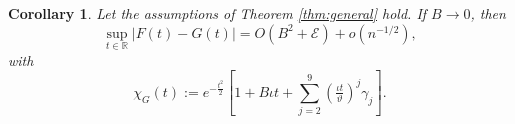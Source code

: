 \documentclass[11pt]{article}
\newtheorem{coro}{Corollary}
\numberwithin{equation}{section}
\theoremstyle{definition}
\newcommand{\E}{\mathbb{E}}
\newcommand{\R}{\mathbb{R}}
\newcommand{\Scale}{\vartheta}
\begin{document}

\begin{coro}\label{coro:general}
    Let the assumptions of Theorem \ref{thm:general} hold. If $B\to 0$, then
    \[\sup_{t\in\R}\left|F(t) - G(t)\right| = O\left( B^2 + \mathcal{E} \right) + o(n^ {-1/2}),\]
    with 
\[
\chi_{G}(t):= e^{-\tfrac{t^2}{2}}\left[ 1 + B\iota t  + \sum_{j=2}^9 \left(\tfrac{\iota t}{\Scale}\right)^j\gamma_j \right].
\]
%  
\end{coro}


\end{document}
